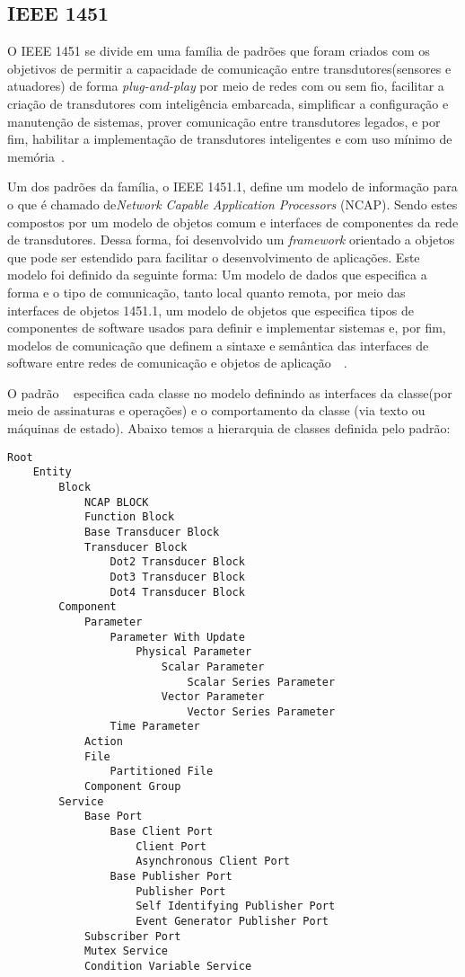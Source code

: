 \subsection{IEEE 1451}
O IEEE 1451 se divide em uma família de padrões que foram criados com os objetivos de permitir a capacidade de comunicação entre transdutores(sensores e atuadores) de forma \emph{plug-and-play} por meio de redes com ou sem fio, facilitar a criação de transdutores com inteligência embarcada, simplificar a configuração e manutenção de sistemas, prover comunicação entre transdutores legados, e por fim, habilitar a implementação de transdutores inteligentes e com uso mínimo de memória~\cite{ieee1451journal}.

Um dos padrões da família, o IEEE 1451.1, define um modelo de informação para o que é chamado de\emph{Network Capable Application Processors} (NCAP). Sendo estes compostos  por um modelo de objetos comum e interfaces de componentes da rede de transdutores. Dessa forma, foi desenvolvido um \emph{framework} orientado a objetos que pode ser estendido para facilitar o desenvolvimento de aplicações. Este modelo foi definido da seguinte forma: Um modelo de dados que especifica a forma e o tipo de comunicação, tanto local quanto remota, por meio das interfaces de objetos 1451.1, um modelo de objetos que especifica tipos de componentes de software usados para definir e implementar sistemas e, por fim, modelos de comunicação que definem a sintaxe e semântica das interfaces de software entre redes de comunicação e objetos de aplicação~\cite{ieeeOO1451}~\cite{ieee1451monitoring}.


O padrão ~\cite{ieee1451standard} especifica cada classe no modelo definindo as interfaces da classe(por meio de assinaturas e operações) e o comportamento da classe (via texto ou máquinas de estado). Abaixo temos a hierarquia de classes definida pelo padrão:

\begin{lstlisting}[frame=single]
Root
	Entity
		Block
			NCAP BLOCK
			Function Block
			Base Transducer Block
			Transducer Block
				Dot2 Transducer Block
				Dot3 Transducer Block
				Dot4 Transducer Block
		Component
			Parameter
				Parameter With Update
					Physical Parameter
						Scalar Parameter
							Scalar Series Parameter
						Vector Parameter
							Vector Series Parameter
				Time Parameter
			Action
			File
				Partitioned File
			Component Group
		Service
			Base Port
				Base Client Port
					Client Port
					Asynchronous Client Port
				Base Publisher Port
					Publisher Port
					Self Identifying Publisher Port
					Event Generator Publisher Port
			Subscriber Port
			Mutex Service
			Condition Variable Service
\end{lstlisting}

